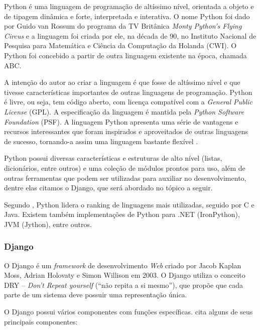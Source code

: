 Python é uma linguagem de programação de altíssimo nível, orientada a objeto
e de tipagem dinâmica e forte, interpretada e interativa. O nome Python foi dado por
Guido van Rossum do programa da TV Britânica \textit{Monty Python’s Flying Circus} e a
linguagem foi criada por ele, na década de 90, no Instituto Nacional de Pesquisa para
Matemática e Ciência da Computação da Holanda (CWI). O Python foi concebido a
partir de outra linguagem existente na época, chamada ABC.

A intenção do autor ao criar a linguagem é que fosse de altíssimo nível e que
tivesse características importantes de outras linguagens de programação. Python é
livre, ou seja, tem código aberto, com licença compatível com a \textit{General Public License}
(GPL). A especificação da linguagem é mantida pela \textit{\textit{Python Software Foundation}}
(PSF). A linguagem Python apresenta uma série de vantagens e recursos
interessantes que foram inspirados e aproveitados de outras linguagens de sucesso,
tornando-a assim uma linguagem bastante flexível \cite{borges}.

Python possui diversas características e estruturas de alto nível (listas,
dicionários, entre outros) e uma coleção de módulos prontos para uso, além de outras
ferramentas que podem ser utilizadas para auxiliar no desenvolvimento, dentre elas
citamos o Django, que será abordado no tópico a seguir.

Segundo , Python lidera o ranking de linguagens
mais utilizadas, seguido por C e Java. Existem também implementações de Python
para .NET (IronPython), JVM (Jython), entre outros.

\subsubsection{Django}

O Django é um \textit{framework} de desenvolvimento \textit{Web} criado por Jacob Kaplan Moss,
Adrian Holovaty e Simon Willison em 2003. O Django utiliza o conceito DRY –
\textit{Don’t Repeat yourself} (“não repita a si mesmo”), que propõe que cada parte de um
sistema deve possuir uma representação única.

O Django possui vários componentes com funções específicas. 
cita alguns de seus principais componentes:

